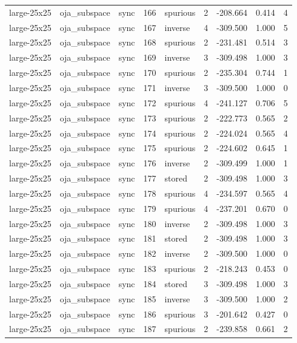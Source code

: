 \begin{tabular}{lllrlrrrr}
large-25x25 & oja\_subspace & sync & 166 & spurious & 2 & -208.664 & 0.414 & 4 \\
large-25x25 & oja\_subspace & sync & 167 & inverse & 4 & -309.500 & 1.000 & 5 \\
large-25x25 & oja\_subspace & sync & 168 & spurious & 2 & -231.481 & 0.514 & 3 \\
large-25x25 & oja\_subspace & sync & 169 & inverse & 3 & -309.498 & 1.000 & 3 \\
large-25x25 & oja\_subspace & sync & 170 & spurious & 2 & -235.304 & 0.744 & 1 \\
large-25x25 & oja\_subspace & sync & 171 & inverse & 3 & -309.500 & 1.000 & 0 \\
large-25x25 & oja\_subspace & sync & 172 & spurious & 4 & -241.127 & 0.706 & 5 \\
large-25x25 & oja\_subspace & sync & 173 & spurious & 2 & -222.773 & 0.565 & 2 \\
large-25x25 & oja\_subspace & sync & 174 & spurious & 2 & -224.024 & 0.565 & 4 \\
large-25x25 & oja\_subspace & sync & 175 & spurious & 2 & -224.602 & 0.645 & 1 \\
large-25x25 & oja\_subspace & sync & 176 & inverse & 2 & -309.499 & 1.000 & 1 \\
large-25x25 & oja\_subspace & sync & 177 & stored & 2 & -309.498 & 1.000 & 3 \\
large-25x25 & oja\_subspace & sync & 178 & spurious & 4 & -234.597 & 0.565 & 4 \\
large-25x25 & oja\_subspace & sync & 179 & spurious & 4 & -237.201 & 0.670 & 0 \\
large-25x25 & oja\_subspace & sync & 180 & inverse & 2 & -309.498 & 1.000 & 3 \\
large-25x25 & oja\_subspace & sync & 181 & stored & 2 & -309.498 & 1.000 & 3 \\
large-25x25 & oja\_subspace & sync & 182 & inverse & 2 & -309.500 & 1.000 & 0 \\
large-25x25 & oja\_subspace & sync & 183 & spurious & 2 & -218.243 & 0.453 & 0 \\
large-25x25 & oja\_subspace & sync & 184 & stored & 3 & -309.498 & 1.000 & 3 \\
large-25x25 & oja\_subspace & sync & 185 & inverse & 3 & -309.500 & 1.000 & 2 \\
large-25x25 & oja\_subspace & sync & 186 & spurious & 3 & -201.642 & 0.427 & 0 \\
large-25x25 & oja\_subspace & sync & 187 & spurious & 2 & -239.858 & 0.661 & 2 \\

\end{tabular}
